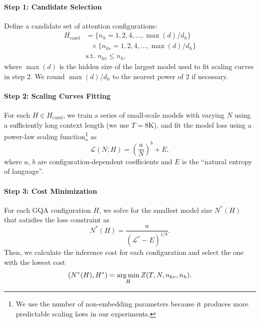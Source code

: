 \paragraph{Step 1: Candidate Selection}

Define a candidate set of attention configurations:
\begin{equation}
\begin{aligned}
H_{\text{cand}} &= \{ n_h = 1, 2, 4, \dots, \max(d)/d_h\} \\
& \,\,\,\, \times \{ n_{kv} = 1, 2, 4, \dots, \max(d)/d_h\}\\
& \text{s.t. } n_{kv}\le n_h,
\end{aligned}
\end{equation}
where $\max(d)$ is the hidden size of the largest model used to fit scaling curves in step 2. We round $\max(d)/d_h$ to the nearest power of 2 if necessary.

\paragraph{Step 2: Scaling Curves Fitting}

For each $H \in H_{\text{cand}}$, we train a series of small-scale models with varying $N$ using a sufficiently long context length (we use $T=8\text{K}$), and fit the model loss using a power-law scaling function\footnote{We use the number of non-embedding parameters because it produces more predictable scaling laws in our experiments.} as 
\begin{equation}
\mathcal{L}(N; H) = \left( \frac{a}{N} \right)^b + E,
\end{equation}
where $a$, $b$ are configuration-dependent coefficients and $E$ is the ``natural entropy of language''.

\paragraph{Step 3: Cost Minimization}

For each GQA configuration $H$, we solve for the smallest model size $N^*(H)$ that satisfies the loss constraint as
\begin{equation}
N^*(H) = \frac{a}{\left( \mathcal{L}^* - E \right)^{1/b}}.
\end{equation}
Then, we calculate the inference cost for each configuration and select the one with the lowest cost
\begin{equation}
(N^*(H), H^*) = \operatorname*{arg\,min}_{H} Z(T, N, n_{kv}, n_h).    
\end{equation}
